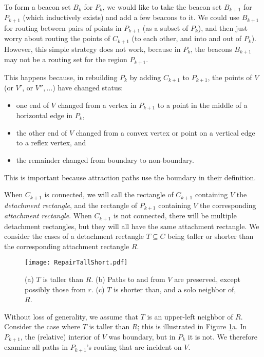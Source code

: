 \documentclass{article}
\begin{document}
	To form a beacon set $B_k$ for $P_k$, we would like to take the beacon set
	$B_{k+1}$ for $P_{k+1}$ (which inductively exists) and add a few beacons to it.
	We could use $B_{k+1}$ for routing between pairs of points in $P_{k+1}$ (as a
	subset of $P_k$), and then just worry about routing the points of $C_{k+1}$ (to
	each other, and into and out of $P_k$).  However, this simple strategy does not work,
	because in $P_k$, the beacons $B_{k+1}$ may not be a routing set for the region
	$P_{k+1}$.
	
	This happens because, in rebuilding $P_{k}$ by adding $C_{k+1}$ to $P_{k+1}$,
	the points of $V$ (or $V'$, or $V'', \ldots$) have changed status:
	\begin{itemize}
	\item one end of $V$ changed from a vertex in $P_{k+1}$ to a point in the
		middle of a horizontal edge in $P_k$,
	\item the other end of $V$ changed from a convex vertex or point on a
		vertical edge to a reflex vertex, and
	\item the remainder changed from boundary to non-boundary.
	\end{itemize}
	
	This is important because attraction paths use the boundary in their
	definition.
	
	When $C_{k+1}$ is connected, we will call the rectangle of $C_{k+1}$ containing
	$V$ the \emph{detachment rectangle}, and the rectangle of $P_{k+1}$ containing $V$
	the corresponding \emph{attachment rectangle}.
	When $C_{k+1}$ is not connected, there will be multiple detachment rectangles,
	but they will all have the same attachment rectangle.
	We consider
	the cases of a detachment rectangle $T \subseteq C$ being taller or shorter
	than the corresponding attachment rectangle $R$.
	
	\begin{figure}[htbp] 
		\begin{center}
		    \texttt{[image: RepairTallShort.pdf]} 
		\end{center}
		\caption{
		    (a) $T$ is taller than $R$.
		    (b) Paths to and from $V$ are preserved, except possibly those from $r$.
		    (c) $T$ is shorter than, and a solo neighbor of, $R$.
		}
		\label{fig:repairtallshort}
	\end{figure}
		
	Without loss of generality, we assume that $T$ is an upper-left neighbor of
	$R$.  Consider the case where $T$ is taller than $R$; this is illustrated in
	Figure \ref{fig:repairtallshort}a.
	In $P_{k+1}$, the (relative) interior of $V$ was boundary, but in $P_k$ it is
	not.  We therefore examine all paths in $P_{k+1}$'s routing that are incident
	on $V$.
	 
\end{document}
